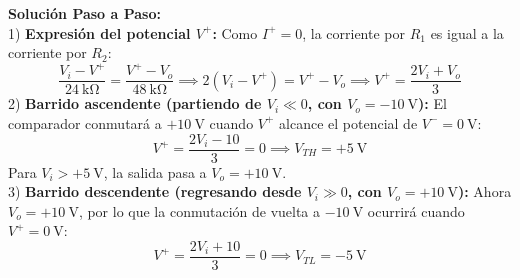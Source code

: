\begin{ejercicio}
\textbf{Solución Paso a Paso:}\\[4pt]
1) \textbf{Expresión del potencial $V^+$:} Como $I^+ = 0$, la corriente por $R_1$ es igual a la corriente por $R_2$:
\begin{equation}
    \frac{V_i - V^+}{24\ \si{\kilo\ohm}} = \frac{V^+ - V_o}{48\ \si{\kilo\ohm}} \implies 2(V_i - V^+) = V^+ - V_o \implies V^+ = \frac{2 V_i + V_o}{3}
\end{equation}
2) \textbf{Barrido ascendente (partiendo de $V_i \ll 0$, con $V_o = -10\ \si{\volt}$):}
El comparador conmutará a $+10\ \si{\volt}$ cuando $V^+$ alcance el potencial de $V^- = 0\ \si{\volt}$:
\begin{equation}
    V^+ = \frac{2 V_i - 10}{3} = 0 \implies V_{TH} = +5\ \si{\volt}
\end{equation}
Para $V_i > +5\ \si{\volt}$, la salida pasa a $V_o = +10\ \si{\volt}$.\\[4pt]
3) \textbf{Barrido descendente (regresando desde $V_i \gg 0$, con $V_o = +10\ \si{\volt}$):}
Ahora $V_o = +10\ \si{\volt}$, por lo que la conmutación de vuelta a $-10\ \si{\volt}$ ocurrirá cuando $V^+ = 0\ \si{\volt}$:
\begin{equation}
    V^+ = \frac{2 V_i + 10}{3} = 0 \implies V_{TL} = -5\ \si{\volt}
\end{equation}
\end{ejercicio}

